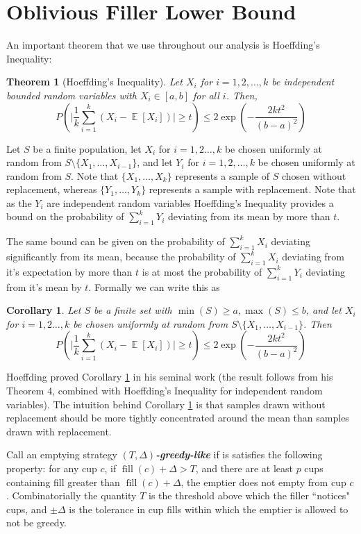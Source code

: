 \documentclass[twocolumn]{article}[10pt]
\newcommand{\defn}[1]{{\textit{\textbf{\boldmath #1}}}\xspace}
\DeclareMathOperator{\E}{\mathbb{E}}
\DeclareMathOperator{\fil}{\text{fill}}
\newtheorem{corollary}{Corollary}
\newtheorem{theorem}{Theorem}
\begin{document}
\section{Oblivious Filler Lower Bound}\label{sec:oblivious}
An important theorem that we use throughout our analysis is Hoeffding's Inequality:
\begin{theorem}[Hoeffding's Inequality]
  Let $X_i$ for $i=1,2,\ldots, k$ be independent bounded random variables with $X_i \in [a,b]$ for all $i$. Then,
  $$P\left(\Big|\frac{1}{k} \sum_{i=1}^k (X_i - \E[X_i])\Big|\ge t\right) \le
  2\exp\left(-\frac{2kt^2}{(b-a)^2}\right) $$
\end{theorem}
Let $S$ be a finite population, let $X_i$ for $i=1,2\ldots, k$ be chosen
uniformly at random from $S \setminus \{X_1,\ldots, X_{i-1}\}$, and let $Y_i$
for $i=1,2,\ldots, k$ be chosen uniformly at random from $S$.
Note that $\{X_1,\ldots, X_k\}$ represents a sample of $S$ chosen without
replacement, whereas $\{Y_1,\ldots, Y_k\}$ represents a sample with
replacement. Note that as the $Y_i$ are independent random variables
Hoeffding's Inequality provides a bound on the probability of $\sum_{i=1}^k
Y_i$ deviating from its mean by more than $t$.

The same bound can be given on the probability of $\sum_{i=1}^k X_i$ deviating
significantly from its mean, because the probability of $\sum_{i=1}^k X_i$
deviating from it's expectation by more than $t$ is at most the probability of
$\sum_{i=1}^k Y_i$ deviating from it's mean by $t$.
Formally we can write this as 
\begin{corollary}
  \label{cor:hoeffdingwreplacement}
  Let $S$ be a finite set with $\min(S) \ge a, \max(S) \le b$, and let $X_i$ for $i=1,2\ldots, k$ be chosen
uniformly at random from $S \setminus \{X_1,\ldots, X_{i-1}\}$.
Then 
  $$P\left(\Big|\frac{1}{k} \sum_{i=1}^k (X_i - \E[X_i])\Big|\ge t\right) \le
  2\exp\left(-\frac{2kt^2}{(b-a)^2}\right) $$
\end{corollary}

Hoeffding proved Corollary \ref{cor:hoeffdingwreplacement} in his seminal work
\cite{who62} (the result follows from his Theorem 4, combined with Hoeffding's
Inequality for independent random variables).
The intuition behind Corollary \ref{cor:hoeffdingwreplacement} is that samples
drawn without replacement should be more tightly concentrated around the mean
than samples drawn with replacement.

Call an emptying strategy $(T, \Delta)$\defn{-greedy-like} if is satisfies the
following property: for any cup $c$, if $\fil(c) + \Delta > T$, and there are
at least $p$ cups containing fill greater than $\fil(c) + \Delta$, the emptier
does not empty from cup $c$. Combinatorially the quantity $T$ is the threshold
above which the filler ``notices" cups, and $\pm\Delta$ is the tolerance in cup
fills within which the emptier is allowed to not be greedy.
\end{document}

